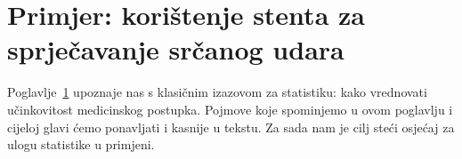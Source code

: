 

\section{Primjer: korištenje stenta za sprječavanje
	srčanog udara}


\label{basicExampleOfStentsAndStrokes}



Poglavlje~\ref{basicExampleOfStentsAndStrokes} upoznaje nas s klasičnim izazovom za statistiku: kako vrednovati učinkovitost medicinskog postupka. Pojmove koje spominjemo u ovom poglavlju i cijeloj glavi ćemo ponavljati i kasnije u tekstu. Za sada nam je cilj steći osjećaj za ulogu statistike u primjeni.


